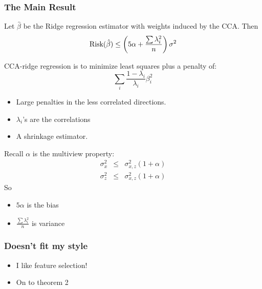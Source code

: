 \documentclass{beamer}
\begin{document}
\begin{frame}
  \frametitle{The Main Result}

  \begin{theorem} Let $\hat{\beta}$ be the Ridge regression estimator
 with weights induced by the CCA.  Then
  \[
  \hbox{Risk}(\hat{\beta}) \le \left(5\alpha+ \frac{\sum \lambda_i^2}{n}\right)\sigma^2
  \]
  \end{theorem}
\begin{overprint}



CCA-ridge regression is to minimize least squares plus a penalty of: 
  \[
\sum_i \frac{1-\lambda_i}{\lambda_i} \beta_i^2
  \]

\begin{itemize}
\item Large penalties in the less correlated directions.
\item $\lambda_i$'s are the correlations
\item A shrinkage estimator.
\end{itemize}


Recall $\alpha$ is the multiview property:
\begin{eqnarray*}
\sigma_x^2 &\le& \sigma_{x,z}^2(1 + \alpha)\\
\sigma_z^2 &\le& \sigma_{x,z}^2(1 + \alpha)
\end{eqnarray*}
So
\begin{itemize}
\item $5 \alpha$ is the bias
\item $\frac{\sum \lambda_i^2}{n}$ is variance
\end{itemize}


\end{overprint}
\end{frame}


\begin{frame}
\frametitle{Doesn't fit my style}
\begin{itemize}
\item I like feature selection!
\item On to theorem 2
\end{itemize}
\end{frame}


\end{document}
